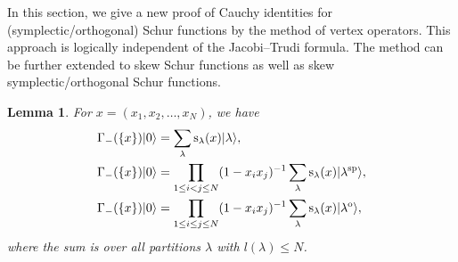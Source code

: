 \documentclass[pdftex]{sigma}
\numberwithin{equation}{section}
\newtheorem{Lemma}[Theorem]{Lemma}
\begin{document}
In this section, we give a new proof of Cauchy identities for (symplectic/orthogonal) Schur functions by the method of vertex operators. This approach is logically independent of the Jacobi--Trudi formula. The method can be further extended to
skew Schur functions as well as skew symplectic/orthogonal Schur functions.
\begin{Lemma}\label{le5}For $x=(x_1,x_2,\dots,x_N)$, we have
\begin{align}
&\Gamma_-(\{x\})|0\rangle=\sum_{\lambda}{\rm s}_\lambda(x)|\lambda\rangle, \label{e:sc11}\\
&\Gamma_-(\{x\})|0\rangle=\prod_{1\leq i<j\leq N}(1-x_ix_j)^{-1}\sum_{\lambda}{\rm s}_\lambda(x)|\lambda^{\rm sp}\rangle, \nonumber\\ %
&\Gamma_-(\{x\})|0\rangle=\prod_{1\leq i\leq j\leq N}(1-x_ix_j)^{-1}\sum_{\lambda}{\rm s}_\lambda(x)|\lambda^{\rm o}\rangle,\nonumber %
\end{align}
where the sum is over all partitions $\lambda$ with $l(\lambda)\leq N$.
\end{Lemma}
\end{document}
